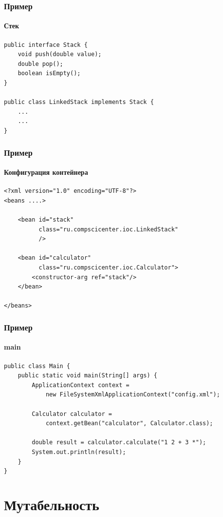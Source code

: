 \documentclass{../../slides-style}
\begin{document}
    \begin{frame}[fragile]
        \frametitle{Пример}
        \framesubtitle{Стек}
        \begin{verbatim}
public interface Stack {
    void push(double value);
    double pop();
    boolean isEmpty();
}

public class LinkedStack implements Stack {
    ...
    ...
}
        \end{verbatim}
    \end{frame}

    \begin{frame}[fragile]
        \frametitle{Пример}
        \framesubtitle{Конфигурация контейнера}
        \begin{verbatim}
<?xml version="1.0" encoding="UTF-8"?>
<beans ....>

    <bean id="stack"
          class="ru.compscicenter.ioc.LinkedStack"
          />

    <bean id="calculator"
          class="ru.compscicenter.ioc.Calculator">
        <constructor-arg ref="stack"/>
    </bean>

</beans>
        \end{verbatim}
    \end{frame}

    \begin{frame}[fragile]
        \frametitle{Пример}
        \framesubtitle{main}
        \begin{verbatim}
public class Main {
    public static void main(String[] args) {
        ApplicationContext context = 
            new FileSystemXmlApplicationContext("config.xml");

        Calculator calculator = 
            context.getBean("calculator", Calculator.class);

        double result = calculator.calculate("1 2 + 3 *");
        System.out.println(result);
    }
}
        \end{verbatim}
    \end{frame}

    \section{Мутабельность}
\end{document}
